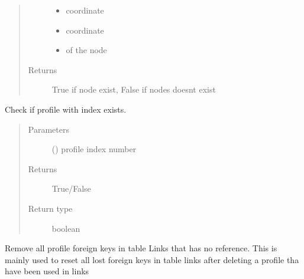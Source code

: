 \documentclass[letterpaper,10pt,english]{sphinxmanual}
\begin{document}
\begin{fulllineitems}
\begin{fulllineitems}
\begin{quote}
\begin{description}
\begin{itemize}
\item {} 
 \textendash{} coordinate

\item {} 
 \textendash{} coordinate

\item {} 
 \textendash{} of the node

\end{itemize}

\item[{Returns}] \leavevmode
True if node exist, False if nodes doesnt exist

\end{description}\end{quote}

\end{fulllineitems}


\begin{fulllineitems}
\label{\detokenize{api:beamon.database.Database.contains_profile}}
Check if profile with index exists.
\begin{quote}\begin{description}
\item[{Parameters}] \leavevmode
{} () \textendash{} profile index number

\item[{Returns}] \leavevmode
True/False

\item[{Return type}] \leavevmode
boolean

\end{description}\end{quote}

\end{fulllineitems}


\begin{fulllineitems}
\label{\detokenize{api:beamon.database.Database.erase_lost_profiles_in_links}}
Remove all profile foreign keys in table Links that has no reference.
This is mainly used to reset all lost foreign keys in table links after deleting a profile tha have been used
in links


\end{fulllineitems}
\end{fulllineitems}
\end{document}
